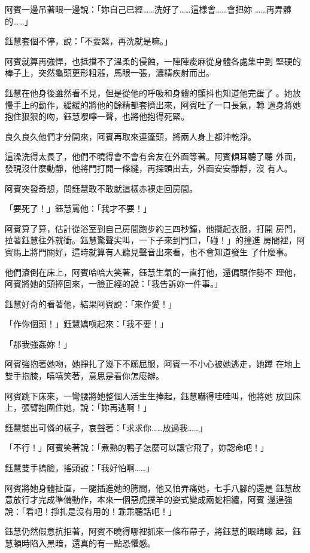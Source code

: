 阿賓一邊吊著眼一邊說：「妳自己已經……洗好了……這樣會……會把妳
……再弄髒的……」

鈺慧套個不停，說：「不要緊，再洗就是嘛。」

阿賓就算再強悍，也抵擋不了溫柔的侵蝕，一陣陣痠麻從身體各處集中到
堅硬的棒子上，突然龜頭更形粗漲，馬眼一張，濃精疾射而出。

鈺慧在他身後雖然看不見，但是從他的呼吸和身體的顫抖也知道他完蛋了
。她放慢手上的動作，緩緩的將他的餘精都套擠出來，阿賓吐了一口長氣，轉
過身將她抱住狠狠的吻，鈺慧嚶嚀一聲，也將他抱得死緊。

良久良久他們才分開來，阿賓再取來連蓬頭，將兩人身上都沖乾淨。

這澡洗得太長了，他們不曉得會不會有舍友在外面等著。阿賓傾耳聽了聽
外面，發現沒什麼動靜，他將門打開一條縫，再探頭出去，外面安安靜靜，沒
有人。

阿賓突發奇想，問鈺慧敢不敢就這樣赤裸走回房間。

「要死了！」鈺慧罵他：「我才不要！」

阿賓算了算，估計從浴室到自己房間跑步約三四秒鐘，他攬起衣服，打開
房門，拉著鈺慧往外就衝。鈺慧驚聲尖叫，一下子來到門口，「碰！」的撞進
房間裡，阿賓馬上將門關好，這時就算有人聽見聲音出來看，也不會知道發生
了什麼事。

他們滾倒在床上，阿賓哈哈大笑著，鈺慧生氣的一直打他，還偏頭作勢不
理他，阿賓將她的頭捧回來，一臉正經的說：「我告訴妳一件事。」

鈺慧好奇的看著他，結果阿賓說：「來作愛！」

「作你個頭！」鈺慧嬌嗔起來：「我不要！」

「那我強姦妳！」

阿賓強抱著她吻，她掙扎了幾下不願屈服，阿賓一不小心被她逃走，她蹲
在地上雙手抱膝，嘻嘻笑著，意思是看你怎麼辦。

阿賓跳下床來，一彎腰將她整個人活生生捧起，鈺慧嚇得哇哇叫，他將她
放回床上，張臂抱圍住她，說：「妳再逃啊！」

鈺慧裝出可憐的樣子，哀聲著：「求求你……放過我……」

「不行！」阿賓笑著說：「煮熟的鴨子怎麼可以讓它飛了，妳認命吧！」

鈺慧雙手摀臉，搖頭說：「我好怕啊……」

阿賓將她身體扯直，一腿插進她的胯間，他又怕弄痛她，七手八腳的還是
鈺慧故意放行才完成準備動作，本來一個惡虎撲羊的姿式變成兩蛇相纏，阿賓
還逞強說：「看吧！掙扎是沒有用的！乖乖聽話吧！」

鈺慧仍然假意抗拒著，阿賓不曉得哪裡抓來一條布帶子，將鈺慧的眼睛矇
起，鈺慧頓時陷入黑暗，還真的有一點恐懼感。

